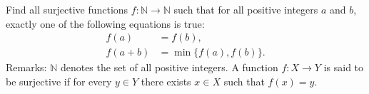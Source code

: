 Find all surjective functions $f:\mathbb{N}\to\mathbb{N}$ such that for all positive integers $a$ and $b$,  exactly one of the following equations is true:\begin{align*}

f(a)&=f(b),  \\

 f(a+b)&=\min\{f(a),f(b)\}.

\end{align*}Remarks: $\mathbb{N}$ denotes the set of all positive integers. A function $f:X\to Y$ is said to be surjective if for every $y\in Y$ there exists $x\in X$ such that $f(x)=y$.